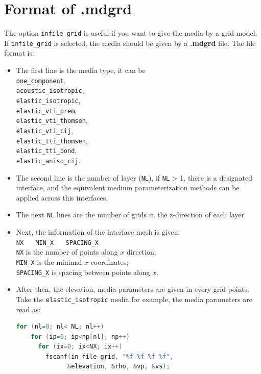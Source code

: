 \section{Format of .mdgrd} \label{mdgrd}

The option \texttt{infile\_grid} is useful if you want to give the media by a grid model.
If \texttt{infile\_grid} is selected, the media should be given by a \textbf{.mdgrd} file. The file format is:
\begin{itemize}
 \item The first line is the media type, it can be \\
 \texttt{one\_component}, \\ 
 \texttt{acoustic\_isotropic}, \\
 \texttt{elastic\_isotropic}, \\
 \texttt{elastic\_vti\_prem}, \\
 \texttt{elastic\_vti\_thomsen}, \\ 
 \texttt{elastic\_vti\_cij}, \\
 \texttt{elastic\_tti\_thomsen}, \\ 
 \texttt{elastic\_tti\_bond}, \\
 \texttt{elastic\_aniso\_cij}.

 \item The second line is the number of layer (\texttt{NL}), if \texttt{NL} > 1, there is a designated interface, and the equivalent medium parameterization methods can be applied across this interfaces.

 \item The next \texttt{NL} lines are the number of grids in the z-direction of each layer 

 \item {Next, the information of the interface mesh is given:\\
  \texttt{NX} ~~ \texttt{MIN\_X}  ~~ \texttt{SPACING\_X}\\
  \texttt{NX} is the number of points along $x$ direction; \\
  \texttt{MIN\_X} is the minimal $x$ coordinates; \\
  \texttt{SPACING\_X} is spacing between points along $x$.
 }

 \item {
  After then, the elevation, media parameters are given in every grid points. Take the \texttt{elastic\_isotropic} media for example, the media parameters are read as:
  \begin{lstlisting}[language = C]
  for (nl=0; nl< NL; nl++)
    for (ip=0; ip<np[nl]; np++)
      for (ix=0; ix<NX; ix++)  
        fscanf(in_file_grid, "%f %f %f %f", 
              &elevation, &rho, &vp, &vs);
  \end{lstlisting}
 } 


\end{itemize}
